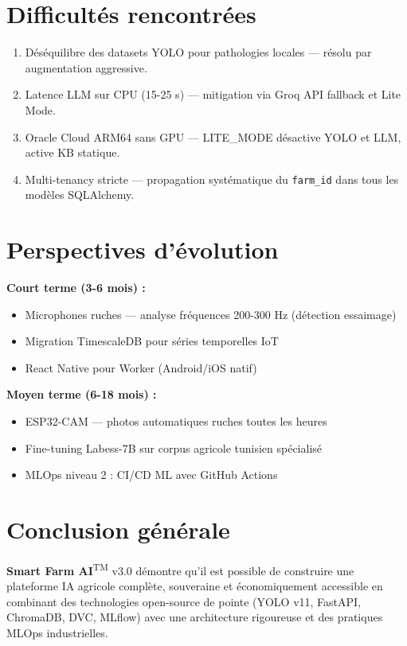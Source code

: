 \documentclass[12pt,a4paper,oneside]{report}
\newcommand{\farmAI}{\textbf{Smart Farm AI}\textsuperscript{TM}}
\newcommand{\code}[1]{\texttt{\small\color{farmgray}#1}}
\begin{document}
\section{Difficultés rencontrées}

\begin{enumerate}
  \item Déséquilibre des datasets YOLO pour pathologies locales — résolu par augmentation aggressive.
  \item Latence LLM sur CPU (15-25 s) — mitigation via Groq API fallback et Lite Mode.
  \item Oracle Cloud ARM64 sans GPU — LITE\_MODE désactive YOLO et LLM, active KB statique.
  \item Multi-tenancy stricte — propagation systématique du \code{farm\_id} dans tous les modèles SQLAlchemy.
\end{enumerate}

\section{Perspectives d'évolution}

\begin{tcolorbox}[infobox,title={Feuille de route v4.0}]
\textbf{Court terme (3-6 mois) :}
\begin{itemize}
  \item Microphones ruches — analyse fréquences 200-300 Hz (détection essaimage)
  \item Migration TimescaleDB pour séries temporelles IoT
  \item React Native pour Worker (Android/iOS natif)
\end{itemize}
\textbf{Moyen terme (6-18 mois) :}
\begin{itemize}
  \item ESP32-CAM — photos automatiques ruches toutes les heures
  \item Fine-tuning Labess-7B sur corpus agricole tunisien spécialisé
  \item MLOps niveau 2 : CI/CD ML avec GitHub Actions
\end{itemize}
\end{tcolorbox}

\section{Conclusion générale}

\farmAI{} v3.0 démontre qu'il est possible de construire une plateforme IA agricole
complète, souveraine et économiquement accessible en combinant des technologies
open-source de pointe (YOLO v11, FastAPI, ChromaDB, DVC, MLflow) avec une architecture
rigoureuse et des pratiques MLOps industrielles.
\end{document}
